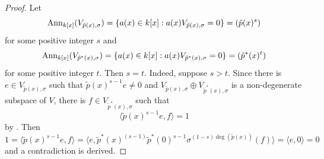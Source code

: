 \documentclass[12pt]{amsart}
\begin{document}
\begin{proof}  Let 
$$ {\rm Ann}_{k[x]}(V_{\tilde{p}(x), \sigma})= \{ a(x)\in k[x]:   a(x) V_{\tilde{p}(x), \sigma} =0 \} =(\tilde{p}(x)^s) $$
for some positive integer $s$ and 
$$ {\rm Ann}_{k[x]}(V_{\tilde{p}^*(x), \sigma})= \{ a(x)\in k[x]:   a(x) V_{\tilde{p}^*(x), \sigma} =0 \} =(\tilde{p}^*(x)^t) $$
for some positive integer $t$. Then $s=t$. Indeed, suppose $s>t$. Since there is $e\in V_{\tilde{p}(x), \sigma} $ such that $\tilde{p}(x)^{s-1} e\neq 0$ and $ V_{\tilde{p}(x), \sigma} \oplus V_{\tilde{p}^*(x), \sigma} $ is a non-degenerate subspace of $V$, there is $f\in V_{\tilde{p}^*(x), \sigma}$ such that $$ \langle  \tilde{p}(x)^{s-1} e ,  f \rangle =1 $$ by \cite[Lemma 3.1]{Mil}. Then 
$$1 = \langle  \tilde{p}(x)^{s-1} e ,  f \rangle =\langle  e ,  \tilde{p}^*(x)^{(s-1)} \tilde{p}^*(0)^{s-1} \sigma^{(1-s)\deg(\tilde{p}(x))}(f) \rangle = \langle  e ,  0 \rangle =0 $$
and a contradiction is derived. 


\end{proof}
\end{document}
